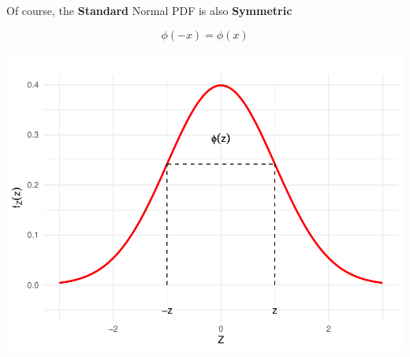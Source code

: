 \documentclass[smaller]{beamer}\usepackage[]{graphicx}\usepackage[]{color}
\newenvironment{knitrout}{}{} %
\begin{document}
\begin{frame}{\secname}

  Of course, the \textbf{Standard} Normal PDF is also \textbf{Symmetric}

  $$\phi(-x) = \phi(x)$$
\begin{knitrout}
\color{fgcolor}

{\centering \includegraphics[width=0.5\linewidth]{figure/unnamed-chunk-3-1} 

}



\end{knitrout}
\end{frame}
\end{document}
